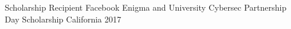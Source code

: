 




\begin{cvhonors}

  \cvhonor
    {Scholarship Recipient} %
    {Facebook Enigma and University Cybersec Partnership Day Scholarship} %
    {California} %
    {2017} %


\end{cvhonors}
